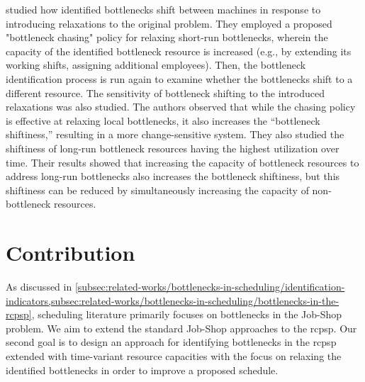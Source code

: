 \citet{Lawrence1994} studied how identified bottlenecks shift between machines
in response to introducing relaxations to the original problem.
They employed a proposed "bottleneck chasing" policy for relaxing short-run bottlenecks,
wherein the capacity of the identified bottleneck resource is increased
(e.g., by extending its working shifts, assigning additional employees).
Then, the bottleneck identification process is run again to examine
whether the bottlenecks shift to a different resource.
The sensitivity of bottleneck shifting to the introduced relaxations was also studied.
The authors observed that while the chasing policy is effective at relaxing local bottlenecks,
it also increases the \enquote{bottleneck shiftiness,}
resulting in a more change-sensitive system.
They also studied the shiftiness of long-run bottleneck resources having the highest utilization over time.
Their results showed that increasing the capacity of bottleneck resources
to address long-run bottlenecks also increases the bottleneck shiftiness,
but this shiftiness can be reduced by simultaneously increasing the capacity of non-bottleneck
resources.

\section{Contribution} \label{sec:related-works/contribution}


As discussed in \cref{subsec:related-works/bottlenecks-in-scheduling/identification-indicators,subsec:related-works/bottlenecks-in-scheduling/bottlenecks-in-the-rcpsp},
scheduling literature primarily focuses on bottlenecks in the Job-Shop problem.
We aim to extend the standard Job-Shop approaches to the \ac{rcpsp}.
Our second goal is to design an approach for identifying bottlenecks in the \ac{rcpsp}
extended with time-variant resource capacities
with the focus on relaxing the identified bottlenecks in order to improve a proposed schedule.

